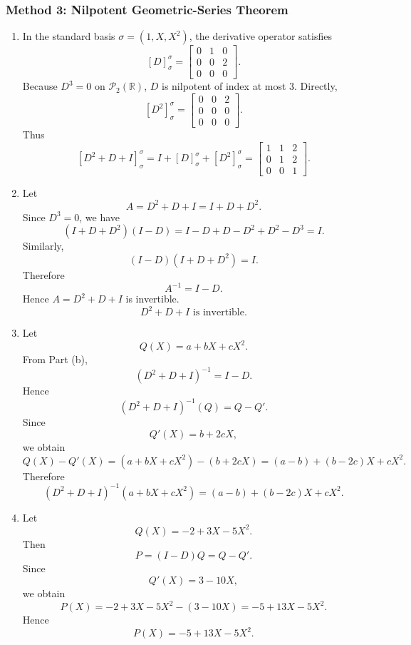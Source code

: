 \documentclass[12pt]{article}
\newcommand{\R}{\mathbb{R}}
\newcommand{\cP}{\mathcal{P}}
\begin{document}
\newpage
\subsubsection{Method 3: Nilpotent Geometric-Series Theorem}
\begin{enumerate}[label=(\alph*)]
  \item In the standard basis $\sigma=(1,X,X^2)$, the derivative operator satisfies
  \[
    [D]_{\sigma}^{\sigma}
    =
    \begin{bmatrix}
      0&1&0\\
      0&0&2\\
      0&0&0
    \end{bmatrix}.
  \]
  Because $D^3=0$ on $\cP_2(\R)$, $D$ is nilpotent of index at most $3$. Directly,
  \[
    [D^2]_{\sigma}^{\sigma}
    =
    \begin{bmatrix}
      0&0&2\\
      0&0&0\\
      0&0&0
    \end{bmatrix}.
  \]
  Thus
  \[
    [D^2+D+I]_{\sigma}^{\sigma}
    =
    I+[D]_{\sigma}^{\sigma}+[D^2]_{\sigma}^{\sigma}
    =
    \boxed{
    \begin{bmatrix}
      1&1&2\\
      0&1&2\\
      0&0&1
    \end{bmatrix}.}
  \]

  \item Let
  \[
    A=D^2+D+I=I+D+D^2.
  \]
  Since $D^3=0$, we have
  \[
    (I+D+D^2)(I-D)
    =I-D+D-D^2+D^2-D^3
    =I.
  \]
  Similarly,
  \[
    (I-D)(I+D+D^2)=I.
  \]
  Therefore
  \[
    A^{-1}=I-D.
  \]
  Hence $A=D^2+D+I$ is invertible.
  \[
    \boxed{D^2+D+I\text{ is invertible}.}
  \]

  \item Let
  \[
    Q(X)=a+bX+cX^2.
  \]
  From Part (b),
  \[
    (D^2+D+I)^{-1}=I-D.
  \]
  Hence
  \[
    (D^2+D+I)^{-1}(Q)=Q-Q'.
  \]
  Since
  \[
    Q'(X)=b+2cX,
  \]
  we obtain
  \[
    Q(X)-Q'(X)
    =(a+bX+cX^2)-(b+2cX)
    =(a-b)+(b-2c)X+cX^2.
  \]
  Therefore
  \[
    \boxed{
    (D^2+D+I)^{-1}(a+bX+cX^2)
    =
    (a-b)+(b-2c)X+cX^2.}
  \]

  \item Let
  \[
    Q(X)=-2+3X-5X^2.
  \]
  Then
  \[
    P=(I-D)Q=Q-Q'.
  \]
  Since
  \[
    Q'(X)=3-10X,
  \]
  we obtain
  \[
    P(X)=-2+3X-5X^2-(3-10X)
    =-5+13X-5X^2.
  \]
  Hence
  \[
    \boxed{P(X)=-5+13X-5X^2.}
  \]
\end{enumerate}
\end{document}
